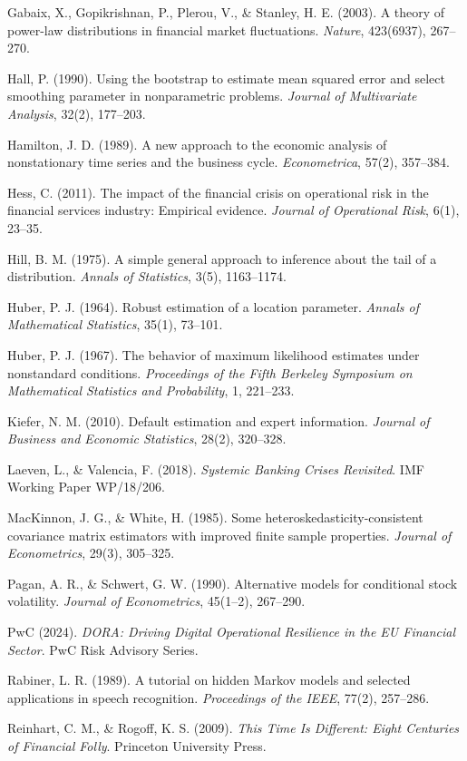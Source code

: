 \documentclass[
]{article}
\begin{document}
Gabaix, X., Gopikrishnan, P., Plerou, V., \& Stanley, H. E. (2003). A
theory of power-law distributions in financial market fluctuations.
\emph{Nature}, 423(6937), 267--270.

Hall, P. (1990). Using the bootstrap to estimate mean squared error and
select smoothing parameter in nonparametric problems. \emph{Journal of
Multivariate Analysis}, 32(2), 177--203.

Hamilton, J. D. (1989). A new approach to the economic analysis of
nonstationary time series and the business cycle. \emph{Econometrica},
57(2), 357--384.

Hess, C. (2011). The impact of the financial crisis on operational risk
in the financial services industry: Empirical evidence. \emph{Journal of
Operational Risk}, 6(1), 23--35.

Hill, B. M. (1975). A simple general approach to inference about the
tail of a distribution. \emph{Annals of Statistics}, 3(5), 1163--1174.

Huber, P. J. (1964). Robust estimation of a location parameter.
\emph{Annals of Mathematical Statistics}, 35(1), 73--101.

Huber, P. J. (1967). The behavior of maximum likelihood estimates under
nonstandard conditions. \emph{Proceedings of the Fifth Berkeley
Symposium on Mathematical Statistics and Probability}, 1, 221--233.

Kiefer, N. M. (2010). Default estimation and expert information.
\emph{Journal of Business and Economic Statistics}, 28(2), 320--328.

Laeven, L., \& Valencia, F. (2018). \emph{Systemic Banking Crises
Revisited}. IMF Working Paper WP/18/206.

MacKinnon, J. G., \& White, H. (1985). Some
heteroskedasticity-consistent covariance matrix estimators with improved
finite sample properties. \emph{Journal of Econometrics}, 29(3),
305--325.

Pagan, A. R., \& Schwert, G. W. (1990). Alternative models for
conditional stock volatility. \emph{Journal of Econometrics}, 45(1--2),
267--290.

PwC (2024). \emph{DORA: Driving Digital Operational Resilience in the EU
Financial Sector}. PwC Risk Advisory Series.

Rabiner, L. R. (1989). A tutorial on hidden Markov models and selected
applications in speech recognition. \emph{Proceedings of the IEEE},
77(2), 257--286.

Reinhart, C. M., \& Rogoff, K. S. (2009). \emph{This Time Is Different:
Eight Centuries of Financial Folly}. Princeton University Press.
\end{document}
